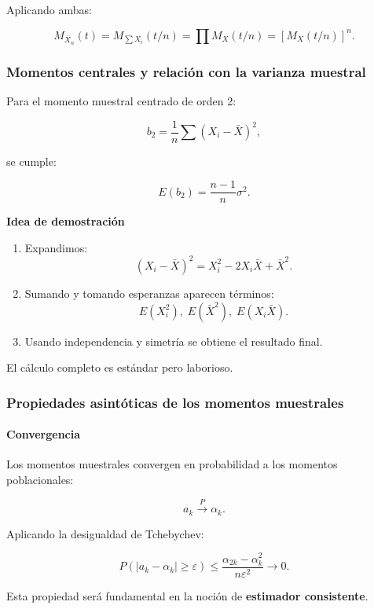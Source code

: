 \documentclass[
]{article}
\providecommand{\tightlist}{%
  \setlength{\itemsep}{0pt}\setlength{\parskip}{0pt}}
\begin{document}
Aplicando ambas:

\[
M_{\bar X_n}(t) = M_{\sum X_i}(t/n)
= \prod M_X(t/n)
= \left[M_X(t/n)\right]^n.
\]

\subsubsection{Momentos centrales y relación con la varianza muestral}\label{momentos-centrales-y-relaciuxf3n-con-la-varianza-muestral}

Para el momento muestral centrado de orden 2:

\[
b_2 = \frac{1}{n} \sum (X_i - \bar X)^2,
\]

se cumple:

\[
E(b_2) = \frac{n-1}{n}\sigma^2.
\]

\textbf{Idea de demostración}

\begin{enumerate}
\def\labelenumi{\arabic{enumi}.}
\tightlist
\item
  Expandimos:
  \[
  (X_i - \bar X)^2 = X_i^2 - 2X_i\bar X + \bar X^2.
  \]
\item
  Sumando y tomando esperanzas aparecen términos:
  \[
  E(X_i^2),\; E(\bar X^2),\; E(X_i\bar X).
  \]
\item
  Usando independencia y simetría se obtiene el resultado final.
\end{enumerate}

El cálculo completo es estándar pero laborioso.

\subsubsection{Propiedades asintóticas de los momentos muestrales}\label{propiedades-asintuxf3ticas-de-los-momentos-muestrales}

\paragraph{Convergencia}\label{convergencia}

Los momentos muestrales convergen en probabilidad a los momentos poblacionales:

\[
a_k \xrightarrow{P} \alpha_k.
\]

Aplicando la desigualdad de Tchebychev:

\[
P(|a_k - \alpha_k|\ge \varepsilon)
\le
\frac{\alpha_{2k}-\alpha_k^2}{n\varepsilon^2}
\to 0.
\]

Esta propiedad será fundamental en la noción de \textbf{estimador consistente}.
\end{document}
